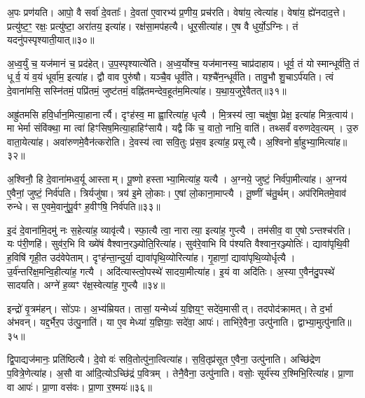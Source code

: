 अ॒पः प्रण॑यति।
आपो॒ वै सर्वा॑ दे॒वताः᳚।
दे॒वता॑ ए॒वारभ्य॑ प्र॒णीय॒ प्रच॑रति।
वेषा॑य॒ त्वेत्या॑ह।
वेषा॑य॒ ह्ये॑नदाद॒त्ते।
प्रत्यु॑ष्ट॒ꣳ॒ रक्षः॒ प्रत्यु॑ष्टा॒ अरा॑तय॒ इत्या॑ह।
रक्ष॑सा॒मप॑हत्यै।
धूर॒सीत्या॑ह।
ए॒ष वै धुर्यो॒\-ऽग्निः।
तं यदनु॑पस्पृश्याती॒यात्॥३०॥

अ॒ध्व॒र्युं च॒ यज॑मानं च॒ प्रद॑हेत्।
उ॒प॒स्पृश्यात्ये॑ति।
अ॒ध्व॒र्योश्च॒ यज॑मानस्य॒ चाप्र॑दाहाय।
धूर्व॒ तं योस्मान्धूर्व॑ति॒ तं धूर्व॒ यं व॒यं धूर्वा॑म॒ इत्या॑ह।
द्वौ वाव पुरु॑षौ।
यञ्चै॒व धूर्व॑ति।
यश़्चै॑न॒न्धूर्व॑ति।
तावु॒भौ शु॒चा\-ऽर्प॑यति।
त्वं दे॒वाना॑मसि॒ सस्नि॑तमं॒ पप्रि॑तमं॒ जुष्ट॑तमं॒ वह्नि॑तमन्देव॒हूत॑म॒मित्या॑ह।
य॒था॒य॒जुरे॒वैतत्॥३१॥

अह्रु॑तमसि हवि॒र्धान॒मित्या॒हानार्त्यै।
दृꣳह॑स्व॒ मा ह्वा॒रित्या॑ह॒ धृत्यै।
मि॒त्रस्य॑ त्वा॒ चक्षु॑षा॒ प्रेक्ष॒ इत्या॑ह मित्र॒त्वाय॑।
मा भेर्मा संवि॑क्था॒ मा त्वा॑ हिꣳसिष॒मित्या॒हाहिꣳ॑सायै।
यद्वै किं च॒ वातो॒ नाभि॒ वाति॑।
तथ्सर्वं॑ वरुणदेव॒त्यम्।
उ॒रु वाता॒येत्या॑ह।
अवा॑रुणमे॒वैन॑त्करोति।
दे॒वस्य॑ त्वा सवि॒तुः प्र॑स॒व इत्या॑ह॒ प्रसूत्यै।
अ॒श्विनोर्बा॒हुभ्या॒मित्या॑ह॥३२॥

अ॒श्विनौ॒ हि दे॒वाना॑मध्व॒र्यू आस्ताम्।
पू॒ष्णो हस्ताभ्या॒मित्या॑ह॒ यत्यै।
अ॒ग्नये॒ जुष्टं॒ निर्व॑पा॒मीत्या॑ह।
अ॒ग्नय॑ ए॒वैनां॒ जुष्टं॒ निर्व॑पति।
त्रिर्यजु॑षा।
त्रय॑ इ॒मे लो॒काः।
ए॒षां लो॒काना॒माप्त्यै।
तू॒ष्णीं च॑तु॒र्थम्।
अप॑रिमितमे॒वाव॑ रुन्धे।
स ए॒वमे॒वानु॑पू॒र्वꣳ ह॒वीꣳषि॒ निर्व॑पति॥३३॥

इ॒दं दे॒वाना॑मि॒दमु॑ नः स॒हेत्या॑ह॒ व्यावृ॑त्यै।
स्फा॒त्यै त्वा॒ नारात्या॒ इत्या॑ह॒ गुप्त्यै।
तम॑सीव॒ वा ए॒षो\-ऽन्तश्च॑रति।
यः प॑री॒णहि॑।
सुव॑र॒भि वि ख्ये॑षं वैश्वान॒रञ्ज्योति॒रित्या॑ह।
सुव॑रे॒वाभि वि प॑श्यति वैश्वान॒रञ्ज्योतिः॑।
द्यावा॑पृथि॒वी ह॒विषि॑ गृही॒त उद॑वेपेताम्।
दृꣳह॑न्ता॒न्दुर्या॒ द्यावा॑पृथि॒व्योरित्या॑ह।
गृ॒हाणां॒ द्यावा॑पृथि॒व्योर्धृत्यै।
उ॒र्व॑न्तरि॑क्ष॒मन्वि॒हीत्या॑ह॒ गत्यै।
अदि॑त्यास्त्वो॒पस्थे॑ सादया॒मीत्या॑ह।
इ॒यं वा अदि॑तिः।
अ॒स्या ए॒वैन॑दु॒पस्थे॑ सादयति।
अग्ने॑ ह॒व्यꣳ र॑क्ष॒स्वेत्या॑ह॒ गुप्त्यै॥३४॥\anuvakamend[य॒ज्ञो वा आपो॒ धाम॑ प्र॒णीय॒ प्रच॑रत्यती॒यादे॒तद्बा॒हुभ्या॒मित्या॑ह ह॒वीꣳषि॒ निर्व॑पति॒ गत्यै॑ च॒त्वारि॑ च]

इन्द्रो॑ वृ॒त्रम॑हन्।
सो॑ऽपः।
अ॒भ्य॑म्रियत।
तासां॒ यन्मेध्यं॑ य॒ज्ञिय॒ꣳ॒ सदे॑व॒मासीत्।
तदपोद॑क्रामत्।
ते द॒र्भा अ॑भवन्।
यद्द॒र्भैर॒प उ॑त्पु॒नाति॑।
या ए॒व मेध्या॑ य॒ज्ञियाः॒ सदे॑वा॒ आपः॑।
ताभि॑रे॒वैना॒ उत्पु॑नाति।
द्वाभ्या॒मुत्पु॑नाति॥३५॥

द्वि॒पाद्यज॑मानः॒ प्रति॑ष्ठित्यै।
दे॒वो वः॑ सवि॒तोत्पु॑ना॒त्वित्या॑ह।
स॒वि॒तृप्र॑सूत ए॒वैना॒ उत्पु॑नाति।
अच्छि॑द्रेण प॒वित्रे॒णेत्या॑ह।
अ॒सौ वा आ॑दि॒त्यो\-ऽच्छि॑द्रं प॒वित्रम्।
तेनै॒वैना॒ उत्पु॑नाति।
वसोः॒ सूर्य॑स्य र॒श्मिभि॒रित्या॑ह।
प्रा॒णा वा आपः॑।
प्रा॒णा वस॑वः।
प्रा॒णा र॒श्मयः॑॥३६॥

